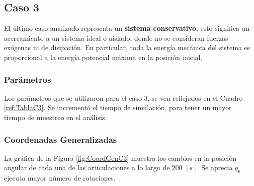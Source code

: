     

\subsection{Caso 3}\label{caso3}
    \noindent El último caso analizado representa un \textbf{sistema conservativo}, esto significa 
    un acercamiento a un sistema ideal o aislado, donde no se consideran fuerzas exógenas
    ni de disipación. En partícular, toda la energía mecánica del sistema es proporcional
    a la energía potencial máxima en la posición inicial. 

    \subsubsection{Parámetros}
    \noindent Los parámetros que se utilizaron para el caso 3, se ven reflejados en el 
    Cuadro \ref{ref:TablaC3}. Se incrementó el tiempo de simulación, para tener un 
    mayor tiempo de muestreo en el análisis.

    \begin{table}[H]%
        \centering
        \begin{center}
        \caption{Parámetros modificados del simulador (Sistema Conservativo)} 
        \centering
        \end{center}
        \label{ref:TablaC3}
    \end{table}

    \subsubsection{Coordenadas Generalizadas}
    \noindent La gráfica de la Figura \ref{fig:CoordGenC3} muestra los cambios en la posición 
    angular de cada una de las articulaciones a lo largo de $200$ $[s]$. 
    Se aprecia $q_6$ ejecuta mayor número de rotaciones. 

